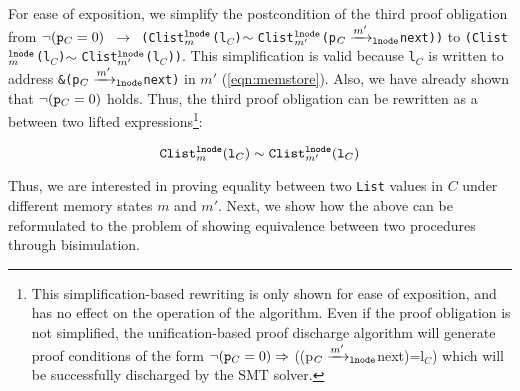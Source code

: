 For ease of exposition, we simplify the postcondition of the third proof obligation
from
{\small \tt $\neg({\tt p}_C=0)$ $\rightarrow$ (Clist$_{m}^{{\tt lnode}}$(l$_C$)$\sim{}$Clist$_{m'}^{{\tt lnode}}$(p$_C\xrightarrow[]{m'}_{\mathrm{\tt lnode}}$next))}
to
{\tt (Clist$_{m}^{{\tt lnode}}$(l$_C$)$\sim{}$Clist$_{m'}^{{\tt lnode}}$(l$_C$))}.
This simplification is valid because {\tt l$_C$}
is written
to address {\tt \&(p$_C\xrightarrow[]{m'}_{\mathrm{\tt lnode}}$next)}
in $m'$ (\cref{eqn:memstore}).
Also, we have already
shown that $\neg({\tt p}_C=0)$ holds.
Thus, the third proof obligation can be rewritten as
a \recursiveRelation{} between two lifted expressions\footnote{This
simplification-based rewriting is only
shown for ease of exposition,
and has no effect on the operation
of the algorithm.
Even if the proof obligation is not simplified,
the unification-based proof discharge algorithm will generate
proof conditions of the form $\neg({\tt p}_C=0)\Rightarrow{}$((p$_C\xrightarrow[]{m'}_{\mathrm{\tt lnode}}$next)=l$_C$)
which will be successfully discharged by the SMT solver.}:
\begin{small}
\begin{equation}\label{eqn:clistPreserved}
{\tt Clist}_m^{\tt lnode}({\tt l}_C) \sim{} {\tt Clist}_{m'}^{\tt lnode}({{\tt l}_C})
\end{equation}
\end{small}

Thus, we are interested in proving equality
between two {\tt List} values in $C$ under different memory states $m$ and $m'$.
Next, we show how the above can be reformulated to the problem of
showing equivalence between two procedures through bisimulation.



